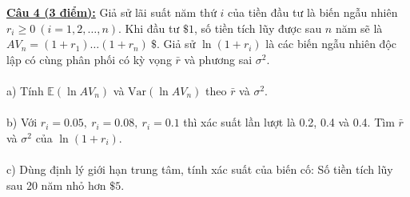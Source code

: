 \documentclass[10pt, a4paper]{article}
\begin{document}
\color{red}\underline{\textbf{Câu 4 (3 điểm):}} \color{black}Giả sử lãi suất năm thứ $i$ của tiền đầu tư là biến ngẫu nhiên $r_i\ge0~(i=1,2,\dots,n)$. Khi đầu tư $\$1$, số tiền tích lũy được sau $n$ năm sẽ là $AV_n=(1+r_1)\dots(1+r_n)~\$$. Giả sử $\ln(1+r_i)$ là các biến ngẫu nhiên độc lập có cùng phân phối có kỳ vọng $\bar r$ và phương sai $\sigma^2$.\\\\
\color{red}a) \color{black}Tính $\mathbb E(\ln AV_n)$ và $\text{Var}(\ln AV_n)$ theo $\bar r$ và $\sigma^2$.\\\\
\color{red}b) \color{black}Với $r_i=0.05,~r_i=0.08,~r_i=0.1$ thì xác suất lần lượt là 0.2, 0.4 và 0.4. Tìm $\bar r$ và $\sigma^2$ của $\ln(1+r_i)$.\\\\
\color{red}c) \color{black}Dùng định lý giới hạn trung tâm, tính xác suất của biến cố: Số tiền tích lũy sau 20 năm nhỏ hơn $\$5$.

\newpage
\end{document}
